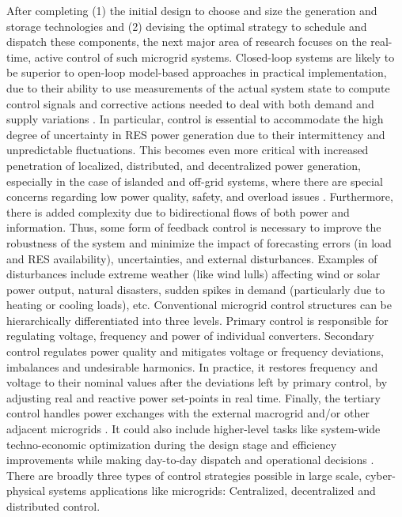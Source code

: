 \documentclass[final,3p,times]{elsarticle}
\begin{document}
After completing (1) the initial design to choose and size the generation and storage technologies and (2) devising the optimal strategy to schedule and dispatch these components, the next major area of research focuses on the real-time, active control of such microgrid systems. Closed-loop systems are likely to be superior to open-loop model-based approaches in practical implementation, due to their ability to use measurements of the actual system state to compute control signals and corrective actions needed to deal with both demand and supply variations \cite{tazvinga2014}. In particular, control is essential to accommodate the high degree of uncertainty in RES power generation due to their intermittency and unpredictable fluctuations. This becomes even more critical with increased penetration of localized, distributed, and decentralized power generation, especially in the case of islanded and off-grid systems, where there are special concerns regarding low power quality, safety, and overload issues \cite{pourbabak2017}. Furthermore, there is added complexity due to bidirectional flows of both power and information. Thus, some form of feedback control is necessary to improve the robustness of the system and minimize the impact of forecasting errors (in load and RES availability), uncertainties, and external disturbances. Examples of disturbances include extreme weather (like wind lulls) affecting wind or solar power output, natural disasters, sudden spikes in demand (particularly due to heating or cooling loads), etc. Conventional microgrid control structures can be hierarchically differentiated into three levels. Primary control is responsible for regulating voltage, frequency and power of individual converters. Secondary control regulates power quality and mitigates voltage or frequency deviations, imbalances and undesirable harmonics. In practice, it restores frequency and voltage to their nominal values after the deviations left by primary control, by adjusting real and reactive power set-points in real time. Finally, the tertiary control handles power exchanges with the external macrogrid and/or other adjacent microgrids \cite{dragicevic_2017}. It could also include higher-level tasks like system-wide techno-economic optimization during the design stage and efficiency improvements while making day-to-day dispatch and operational decisions \cite{mg_review}. There are broadly three types of control strategies possible in large scale, cyber-physical systems applications like microgrids: Centralized, decentralized and distributed control.
\end{document}
